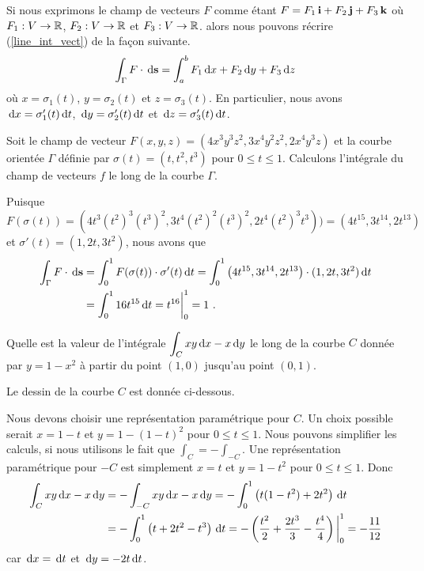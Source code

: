 {\begin{defn}
Si nous exprimons le champ de vecteurs $F$ comme étant
$F = F_1\,\mathbf{i} + F_2\,\mathbf{j} + F_3\,\mathbf{k}$ où $F_1:V\rightarrow \mathbb{R}$,
$F_2:V\rightarrow \mathbb{R}$ et $F_3:V\rightarrow \mathbb{R}$. alors nous pouvons récrire
(\ref{line_int_vect}) de la façon suivante.
\[
\int_\Gamma F \cdot \,\mathrm{d}\mathbf{s} = \int_a^b F_1\,\mathrm{d}x + F_2\,\mathrm{d}y +
F_3\,\mathrm{d}z
\]
où $x = \sigma_1(t)$, $y = \sigma_2(t)$ et $z=\sigma_3(t)$.  En
particulier, nous avons  $\,\mathrm{d}x = \sigma_1'(t) \,\mathrm{d}t$,
$\,\mathrm{d}y = \sigma_2'(t) \,\mathrm{d}t$ et $\,\mathrm{d}z = \sigma_3'(t) \,\mathrm{d}t$.
\end{defn}

\begin{egg}
Soit le champ de vecteur $F(x,y,z) = (4x^3y^3z^2,3x^4y^2z^2, 2x^4y^3z)$
et la courbe orientée $\Gamma$ définie par $\sigma(t) = (t,t^2,t^3)$ pour
$0\leq t \leq 1$.  Calculons l'intégrale du champ de vecteurs
$f$ le long de la courbe $\Gamma$.

Puisque
\[
F(\sigma(t)) = \left(4t^3 (t^2)^3 (t^3)^2,3t^4(t^2)^2(t^3)^2,
    2t^4(t^2)^3t^3\right))
= \left( 4t^{15} , 3t^{14} , 2t^{13}\right)
\]
et
$\sigma'(t) = (1, 2t, 3t^2)$, nous avons que
\begin{align*}
\int_{\Gamma} F \cdot \,\mathrm{d}\mathbf{s} &=
\int_0^1 F(\sigma(t)) \cdot \sigma'(t) \,\mathrm{d}t
= \int_0^1 \left( 4t^{15} , 3t^{14} , 2t^{13}\right)\cdot 
(1, 2t, 3t^2) \,\mathrm{d}t \\
& = \int_0^1 16 t^{15} \,\mathrm{d}t = t^{16}\bigg|_0^1 = 1 \ .
\end{align*}
\label{ICegg1}
\end{egg}

\begin{egg}
Quelle est la valeur de l'intégrale
$\displaystyle \int_C xy \,\mathrm{d}x - x \,\mathrm{d}y$ le long de la courbe $C$
donnée par $y=1-x^2$ à partir du point $(1,0)$ jusqu'au point $(0,1)$.

Le dessin de la courbe $C$ est donnée ci-dessous.

Nous devons choisir une représentation paramétrique pour $C$.  Un choix
possible serait $x=1-t$ et $y = 1-(1-t)^2$ pour $0 \leq t \leq 1$.
Nous pouvons simplifier les calculs, si nous utilisons le fait que
$\displaystyle \int_C = - \int_{-C}$.  Une représentation
paramétrique pour $-C$ est simplement $x=t$ et $y = 1-t^2$ pour
$0 \leq t \leq 1$.  Donc
\begin{align*}
\int_C xy \,\mathrm{d}x - x \,\mathrm{d}y &= -\int_{-C} xy \,\mathrm{d}x - x \,\mathrm{d}y
= - \int_0^1 \left( t(1-t^2) + 2t^2 \right) \,\mathrm{d}t \\
&= - \int_0^1 \left( t + 2t^2 - t^3\right) \,\mathrm{d}t
= - \left( \frac{t^2}{2} + \frac{2t^3}{3} - \frac{t^4}{4} \right)\bigg|_0^1
= -\frac{11}{12}
\end{align*}
car $\,\mathrm{d}x = \,\mathrm{d}t$ et $\,\mathrm{d}y = -2 t \,\mathrm{d}t$.
\end{egg}

}
